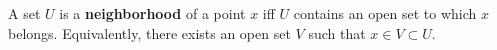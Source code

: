 A set $U$ is a \textbf{neighborhood} of a point $x$ iff $U$ contains an open set to which $x$ belongs. Equivalently, there exists an open set $V$ such that $x \in V \subset U$.
